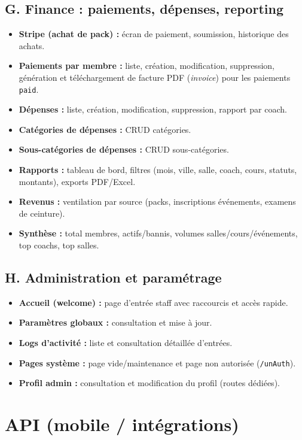 \documentclass[12pt, a4paper]{article}
\begin{document}
\subsection{G. Finance : paiements, dépenses, reporting}
\begin{itemize}
    \item \textbf{Stripe (achat de pack) :} écran de paiement, soumission, historique des achats.
    \item \textbf{Paiements par membre :} liste, création, modification, suppression, génération et téléchargement de facture PDF (\textit{invoice}) pour les paiements \texttt{paid}.
    \item \textbf{Dépenses :} liste, création, modification, suppression, rapport par coach.
    \item \textbf{Catégories de dépenses :} CRUD catégories.
    \item \textbf{Sous-catégories de dépenses :} CRUD sous-catégories.
    \item \textbf{Rapports :} tableau de bord, filtres (mois, ville, salle, coach, cours, statuts, montants), exports PDF/Excel.
    \item \textbf{Revenus :} ventilation par source (packs, inscriptions événements, examens de ceinture).
    \item \textbf{Synthèse :} total membres, actifs/bannis, volumes salles/cours/événements, top coachs, top salles.
\end{itemize}

\subsection{H. Administration et paramétrage}
\begin{itemize}
    \item \textbf{Accueil (welcome) :} page d'entrée staff avec raccourcis et accès rapide.
    \item \textbf{Paramètres globaux :} consultation et mise à jour.
    \item \textbf{Logs d'activité :} liste et consultation détaillée d'entrées.
    \item \textbf{Pages système :} page vide/maintenance et page non autorisée (\texttt{/unAuth}).
    \item \textbf{Profil admin :} consultation et modification du profil (routes dédiées).
\end{itemize}

\section{API (mobile / intégrations)}
\end{document}
